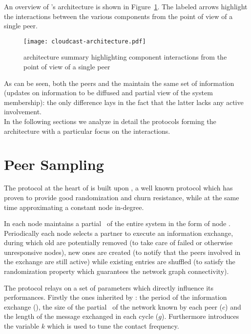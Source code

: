 An overview of \cloudcast's architecture is shown in
Figure~\ref{fig:cloudcast-architecture}. The labeled arrows highlight the
interactions between the various components from the point of view of a
single peer.

\begin{figure}
  \texttt{[image: cloudcast-architecture.pdf]}
  \caption{\cloudcast architecture summary highlighting component
    interactions from the point of view of a single peer}
  \label{fig:cloudcast-architecture}
\end{figure}

As can be seen, both the peers and the \cloud maintain the same set of
information (updates on information to be diffused and partial view of
the system membership): the only difference lays in the fact that the latter
lacks any active involvement.
\ \\
In the following sections we analyze in detail the protocols
forming the \cloudcast architecture with a particular focus on the
\cloud interactions.

\section{Peer Sampling}
The \peersampling protocol at the heart of \cloudcast is built upon
\cyclon \cite{CYCLON}, a well known \peersampling \gossip protocol
which has proven to provide good randomization and churn resistance,
while at the same time approximating a constant node in-degree.

In \cloudcast each node maintains a partial \view\ of the entire system
in the form of node \descriptors. Periodically each node selects
a partner to execute an information exchange, during which old
\descriptors are potentially removed (to take care of failed or
otherwise unresponsive nodes), new ones are created (to notify that the
peers involved in the exchange are still active) while existing
entries are shuffled (to satisfy the randomization property which
guarantees the network graph connectivity).

The protocol relays on a set of parameters which directly influence its
performances. Firstly the ones inherited by \cyclon: the period of
the information exchange (\deltacyclon), the size of the partial
\view\ of the network known by each peer ($c$) and the length
of the message exchanged in each cycle ($g$). Furthermore
\cloudcast introduces the variable $k$ which is used to tune the
\cloud contact frequency.

